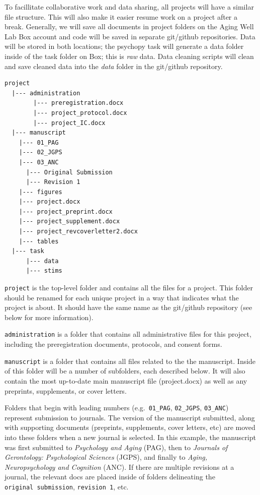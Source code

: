 \documentclass[
]{book}
\begin{document}
To facillitate collaborative work and data sharing, all projects will have a similar file structure. This will also make it easier resume work on a project after a break. Generally, we will save all documents in project folders on the Aging Well Lab Box account and code will be saved in separate git/github repositories. Data will be stored in both locations; the psychopy task will generate a data folder inside of the task folder on Box; this is \emph{raw} data. Data cleaning scripts will clean and save cleaned data into the \emph{data} folder in the git/github repository.

\begin{verbatim}
project
  |--- administration 
        |--- preregistration.docx
        |--- project_protocol.docx
        |--- project_IC.docx
  |--- manuscript
    |--- 01_PAG
    |--- 02_JGPS
    |--- 03_ANC
      |--- Original Submission
      |--- Revision 1
    |--- figures
    |--- project.docx
    |--- project_preprint.docx
    |--- project_supplement.docx
    |--- project_revcoverletter2.docx
    |--- tables
  |--- task
      |--- data
      |--- stims
\end{verbatim}

\texttt{project} is the top-level folder and contains all the files for a project. This folder should be renamed for each unique project in a way that indicates what the project is about. It should have the same name as the git/github repository (see below for more information).

\texttt{administration} is a folder that contains all administrative files for this project, including the preregistration documents, protocols, and consent forms.

\texttt{manuscript} is a folder that contains all files related to the the manuscript. Inside of this folder will be a number of subfolders, each described below. It will also contain the most up-to-date main manuscript file (project.docx) as well as any preprints, supplements, or cover letters.

Folders that begin with leading numbers (e.g.~\texttt{01\_PAG}, \texttt{02\_JGPS}, \texttt{03\_ANC}) represent submission to journals. The version of the manuscript submitted, along with supporting documents (preprints, supplements, cover letters, etc) are moved into these folders when a new journal is selected. In this example, the manuscript was first submitted to \emph{Psychology and Aging} (PAG), then to \emph{Journals of Gerontology: Psychological Sciences} (JGPS), and finally to \emph{Aging, Neuropsychology and Cognition} (ANC). If there are multiple revisions at a journal, the relevant docs are placed inside of folders delineating the \texttt{original\ submission}, \texttt{revision\ 1}, etc.
\end{document}
